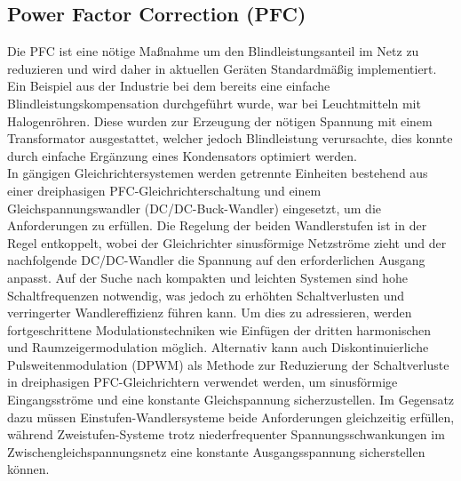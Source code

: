 		
		\subsection{Power Factor Correction (PFC)}
			Die \gls{PFC} ist eine nötige Maßnahme um den Blindleistungsanteil im Netz zu reduzieren und wird daher in aktuellen Geräten Standardmäßig implementiert. Ein Beispiel aus der Industrie bei dem bereits eine einfache Blindleistungskompensation durchgeführt wurde, war bei Leuchtmitteln mit Halogenröhren. Diese wurden zur Erzeugung der nötigen Spannung mit einem Transformator ausgestattet, welcher jedoch Blindleistung verursachte, dies konnte durch einfache Ergänzung eines Kondensators optimiert werden. \\
			In gängigen Gleichrichtersystemen werden getrennte Einheiten bestehend aus einer dreiphasigen PFC-Gleichrichterschaltung und einem Gleichspannungswandler (DC/DC-Buck-Wandler) eingesetzt, um die Anforderungen zu erfüllen. Die Regelung der beiden Wandlerstufen ist in der Regel entkoppelt, wobei der Gleichrichter sinusförmige Netzströme zieht und der nachfolgende DC/DC-Wandler die Spannung auf den erforderlichen Ausgang anpasst. Auf der Suche nach kompakten und leichten Systemen sind hohe Schaltfrequenzen notwendig, was jedoch zu erhöhten Schaltverlusten und verringerter Wandlereffizienz führen kann. Um dies zu adressieren, werden fortgeschrittene Modulationstechniken wie Einfügen der dritten harmonischen und Raumzeigermodulation möglich. Alternativ kann auch Diskontinuierliche Pulsweitenmodulation (DPWM) als Methode zur Reduzierung der Schaltverluste in dreiphasigen PFC-Gleichrichtern verwendet werden, um sinusförmige Eingangsströme und eine konstante Gleichspannung sicherzustellen. Im Gegensatz dazu müssen Einstufen-Wandlersysteme beide Anforderungen gleichzeitig erfüllen, während Zweistufen-Systeme trotz niederfrequenter Spannungsschwankungen im Zwischengleichspannungsnetz eine konstante Ausgangsspannung sicherstellen können.			
			
